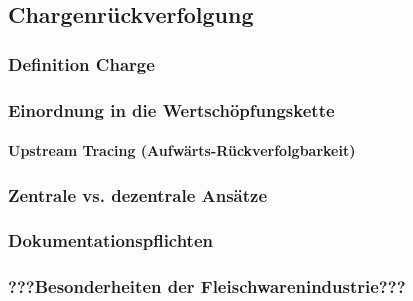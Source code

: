 \subsection{Chargenrückverfolgung}

\subsubsection{Definition Charge}


\subsubsection{Einordnung in die Wertschöpfungskette}


\paragraph{Upstream Tracing (Aufwärts-Rückverfolgbarkeit)}


\subsubsection{Zentrale vs. dezentrale Ansätze}


\subsubsection{Dokumentationspflichten}


\subsubsection{???Besonderheiten der Fleischwarenindustrie???}

